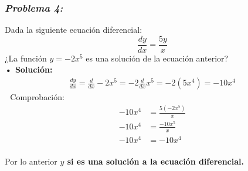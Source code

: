 \documentclass[letterpaper, 12pt]{article}
\begin{document}
\subsubsection*{\emph{Problema 4:}}
Dada la siguiente ecuación diferencial:
\[\frac{dy}{dx}=\frac{5y}{x}\]
¿La función \(y=-2x^5\) es una solución de la ecuación anterior?
\\\newline
\textbf{• Solución:}
\begin{equation*}
    \begin{aligned}
        \frac{dy}{dx}=\frac{d}{dx}-2x^5=-2\frac{d}{dx}x^5=-2\left(5x^4\right)=-10x^4
    \end{aligned}
\end{equation*}
\,\, Comprobación:
\begin{equation*}
    \begin{aligned}
        -10x^4&=\frac{5\left(-2x^5\right)}{x}\\
        -10x^4&=\frac{-10x^5}{x}\\
        -10x^4&=-10x^4
    \end{aligned}
\end{equation*}
\\
Por lo anterior \textbf{\(y\) si es una solución a la ecuación diferencial.}
\end{document}
